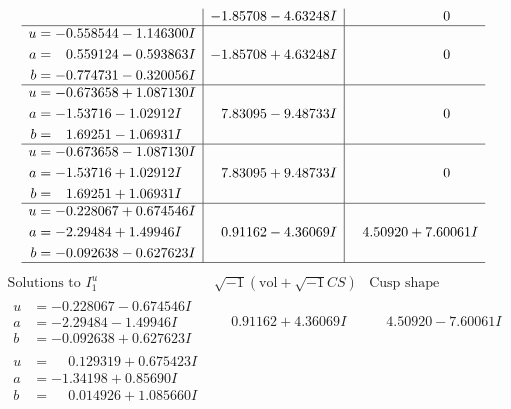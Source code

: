 \documentclass[1p]{elsarticle_modified}
\theoremstyle{definition}
\newcommand{\I}{\sqrt{-1}}
\begin{document}
$$\begin{array}{c|c|c}
 & -1.85708 - 4.63248 I & \phantom{-0.000000 } 0 \\ \hline\begin{aligned}
u &= -0.558544 - 1.146300 I \\
a &= \phantom{-}0.559124 - 0.593863 I \\
b &= -0.774731 - 0.320056 I\end{aligned}
 & -1.85708 + 4.63248 I & \phantom{-0.000000 } 0 \\ \hline\begin{aligned}
u &= -0.673658 + 1.087130 I \\
a &= -1.53716 - 1.02912 I \\
b &= \phantom{-}1.69251 - 1.06931 I\end{aligned}
 & \phantom{-}7.83095 - 9.48733 I & \phantom{-0.000000 } 0 \\ \hline\begin{aligned}
u &= -0.673658 - 1.087130 I \\
a &= -1.53716 + 1.02912 I \\
b &= \phantom{-}1.69251 + 1.06931 I\end{aligned}
 & \phantom{-}7.83095 + 9.48733 I & \phantom{-0.000000 } 0 \\ \hline\begin{aligned}
u &= -0.228067 + 0.674546 I \\
a &= -2.29484 + 1.49946 I \\
b &= -0.092638 - 0.627623 I\end{aligned}
 & \phantom{-}0.91162 - 4.36069 I & \phantom{-}4.50920 + 7.60061 I\\
 \hline 
 \end{array}$$\newpage$$\begin{array}{c|c|c}  
\text{Solutions to }I^u_{1}& \I (\text{vol} + \sqrt{-1}CS) & \text{Cusp shape}\\
 \hline 
\begin{aligned}
u &= -0.228067 - 0.674546 I \\
a &= -2.29484 - 1.49946 I \\
b &= -0.092638 + 0.627623 I\end{aligned}
 & \phantom{-}0.91162 + 4.36069 I & \phantom{-}4.50920 - 7.60061 I \\ \hline\begin{aligned}
u &= \phantom{-}0.129319 + 0.675423 I \\
a &= -1.34198 + 0.85690 I \\
b &= \phantom{-}0.014926 + 1.085660 I\end{aligned}

\end{array}$$
\end{document}

